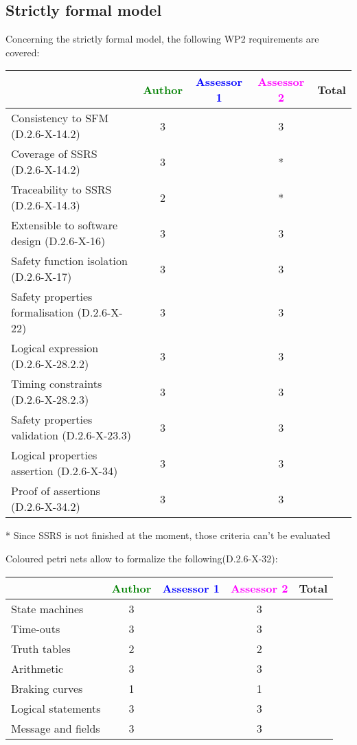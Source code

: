 \subsection{Strictly formal model}

Concerning the strictly formal model, the following WP2 requirements are covered:

\begin{tabular}{|l | c | c | c | c|}
\hline
& \textcolor{green}{Author} & \textcolor{blue}{Assessor 1} & \textcolor{magenta}{Assessor 2} & Total \\
\hline 
Consistency to SFM (D.2.6-X-14.2) & 3 & & 3 &  \\
\hline
Coverage of SSRS (D.2.6-X-14.2)  & 3 & & * &  \\
\hline
Traceability to  SSRS (D.2.6-X-14.3)  & 2 & & * &  \\
\hline
Extensible to software design (D.2.6-X-16)  & 3 & & 3 &  \\
\hline
Safety function isolation (D.2.6-X-17)  & 3 & & 3 &  \\
\hline 
Safety properties formalisation (D.2.6-X-22)  & 3 & & 3 &  \\
\hline
Logical expression (D.2.6-X-28.2.2)  & 3 & & 3 &  \\
\hline
Timing constraints (D.2.6-X-28.2.3)  & 3 & & 3 &  \\
\hline
Safety properties validation (D.2.6-X-23.3)  & 3 & & 3 &  \\
\hline
Logical properties assertion (D.2.6-X-34)  & 3 & & 3 &  \\
\hline
Proof of assertions (D.2.6-X-34.2)  & 3 & & 3 &  \\
\hline
\end{tabular}

\begin{assessor2}
* Since SSRS is not finished at the moment, those criteria can't be evaluated
\end{assessor2}

Coloured petri nets allow to formalize the following(D.2.6-X-32):

\begin{tabular}{|l | c | c | c | c|}
\hline
& \textcolor{green}{Author} & \textcolor{blue}{Assessor 1} & \textcolor{magenta}{Assessor 2} & Total \\
\hline 
State machines  & 3 & & 3 &  \\
\hline
Time-outs  & 3 & & 3 &  \\
\hline
Truth tables  & 2 & & 2 &  \\
\hline
Arithmetic  & 3 & & 3 &  \\
\hline
Braking curves  & 1 & & 1 &  \\
\hline
Logical statements & 3 & & 3 &  \\
\hline
Message and fields & 3 & & 3 &  \\
\hline
\end{tabular}

